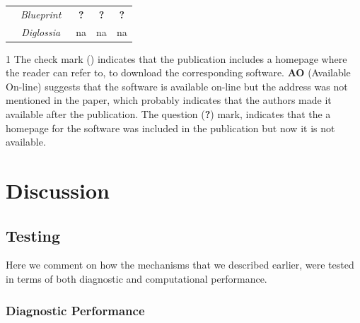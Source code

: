 \documentclass[conference]{IEEEtran}
\newcommand{\tick}{\ding{52}}
\begin{document}
\begin{table}
\begin{threeparttable}
\begin{small}
{\begin{tabular}{l|c|ccc}
  &   {\it Blueprint}~\cite{LV09} & {\bf ?} & {\bf ?} & {\bf ?} \\
  &   {\it Diglossia}~\cite{SMS13} & {\sc na} & {\sc na} & {\sc na} \\
  \hline
    \end{tabular}}
    \begin{tablenotes}
  \begin{footnotesize}
       \item[1] The check mark (\tick) indicates that the publication
       includes a homepage where the reader can refer to, to
       download the corresponding software. {\bf AO} (Available On-line) suggests
       that the software is available on-line but the
       address was not mentioned in the paper, which probably indicates that
       the authors made it available after the publication. The question ({\bf ?})
       mark, indicates that the a homepage for the software was included
       in the publication but now it is not available.
  \end{footnotesize}
    \end{tablenotes}
    \end{small}
    \end{threeparttable}
\end{table}

\section{Discussion}
\label{sec:discussion}

\subsection{Testing}

Here we comment on how the mechanisms that we
described earlier, were tested in terms of both
diagnostic and computational performance.

\subsubsection{Diagnostic Performance}
\end{document}
